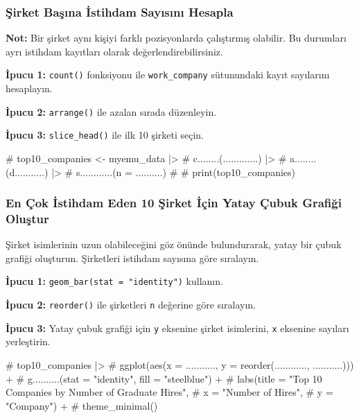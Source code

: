 \documentclass[
  11pt,
  a4paper,
  DIV=11,
  numbers=noendperiod]{scrartcl}
\newenvironment{Shaded}{\begin{snugshade}}{\end{snugshade}}
\newcommand{\CommentTok}[1]{\textcolor[rgb]{0.37,0.37,0.37}{#1}}
\begin{document}
\subsubsection{Şirket Başına İstihdam Sayısını
Hesapla}\label{ux15firket-baux15fux131na-istihdam-sayux131sux131nux131-hesapla}

\textbf{Not:} Bir şirket aynı kişiyi farklı pozisyonlarda çalıştırmış
olabilir. Bu durumları ayrı istihdam kayıtları olarak
değerlendirebilirsiniz.

\textbf{İpucu 1:} \texttt{count()} fonksiyonu ile \texttt{work\_company}
sütunundaki kayıt sayılarını hesaplayın.

\textbf{İpucu 2:} \texttt{arrange()} ile azalan sırada düzenleyin.

\textbf{İpucu 3:} \texttt{slice\_head()} ile ilk 10 şirketi seçin.

\begin{Shaded}
\begin{Highlighting}[]
\CommentTok{\# top10\_companies \textless{}{-} myemu\_data |\textgreater{}}
\CommentTok{\#   c........(.............) |\textgreater{}}
\CommentTok{\#   a........(d...........) |\textgreater{}}
\CommentTok{\#   s............(n = ..........)}
\CommentTok{\#}
\CommentTok{\# print(top10\_companies)}
\end{Highlighting}
\end{Shaded}

\subsubsection{En Çok İstihdam Eden 10 Şirket İçin Yatay Çubuk Grafiği
Oluştur}\label{en-uxe7ok-istihdam-eden-10-ux15firket-iuxe7in-yatay-uxe7ubuk-grafiux11fi-oluux15ftur}

Şirket isimlerinin uzun olabileceğini göz önünde bulundurarak, yatay bir
çubuk grafiği oluşturun. Şirketleri istihdam sayısına göre sıralayın.

\textbf{İpucu 1:} \texttt{geom\_bar(stat\ =\ "identity")} kullanın.

\textbf{İpucu 2:} \texttt{reorder()} ile şirketleri \texttt{n} değerine
göre sıralayın.

\textbf{İpucu 3:} Yatay çubuk grafiği için \texttt{y} eksenine şirket
isimlerini, \texttt{x} eksenine sayıları yerleştirin.

\begin{Shaded}
\begin{Highlighting}[]
\CommentTok{\# top10\_companies |\textgreater{}}
\CommentTok{\#   ggplot(aes(x = ..........., y = reorder(............, ...........))) +}
\CommentTok{\#   g..........(stat = "identity", fill = "steelblue") +}
\CommentTok{\#   labs(title = "Top 10 Companies by Number of Graduate Hires",}
\CommentTok{\#        x = "Number of Hires",}
\CommentTok{\#        y = "Company") +}
\CommentTok{\#   theme\_minimal()}
\end{Highlighting}
\end{Shaded}
\end{document}
